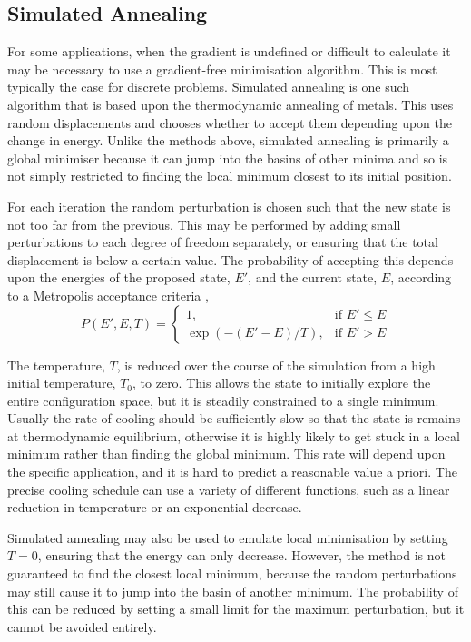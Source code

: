 \subsection{Simulated Annealing}
For some applications, when the gradient is undefined or difficult to calculate it may be necessary to use a gradient-free minimisation algorithm.
This is most typically the case for discrete problems.
Simulated annealing \cite{Kirkpatrick1983} is one such algorithm that is based upon the thermodynamic annealing of metals.
This uses random displacements and chooses whether to accept them depending upon the change in energy.
Unlike the methods above, simulated annealing is primarily a global minimiser because it can jump into the basins of other minima and so is not simply restricted to finding the local minimum closest to its initial position.

For each iteration the random perturbation is chosen such that the new state is not too far from the previous.
This may be performed by adding small perturbations to each degree of freedom separately, or ensuring that the total displacement is below a certain value.
The probability of accepting this depends upon the energies of the proposed state, $E'$, and the current state, $E$, according to a Metropolis acceptance criteria \cite{Metropolis1953},
\begin{equation}
  P(E', E, T) =
  \begin{cases}
    1, & \text{if } E' \le E\\
    \exp( -(E'-E) / T ), & \text{if } E' > E
  \end{cases}
  \label{eq:lm-metropolis}
\end{equation}

The temperature, $T$, is reduced over the course of the simulation from a high initial temperature, $T_0$, to zero.
This allows the state to initially explore the entire configuration space, but it is steadily constrained to a single minimum.
Usually the rate of cooling should be sufficiently slow so that the state is remains at thermodynamic equilibrium, otherwise it is highly likely to get stuck in a local minimum rather than finding the global minimum.
This rate will depend upon the specific application, and it is hard to predict a reasonable value a priori.
The precise cooling schedule can use a variety of different functions, such as a linear reduction in temperature or an exponential decrease.

Simulated annealing may also be used to emulate local minimisation by setting $T=0$, ensuring that the energy can only decrease.
However, the method is not guaranteed to find the closest local minimum, because the random perturbations may still cause it to jump into the basin of another minimum.
The probability of this can be reduced by setting a small limit for the maximum perturbation, but it cannot be avoided entirely.


